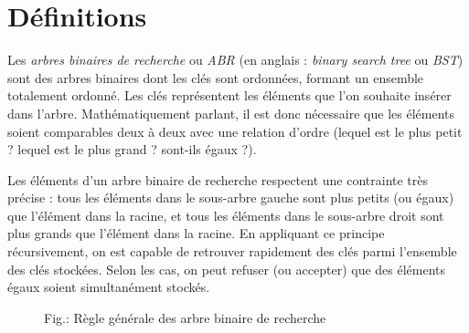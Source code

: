 \documentclass[11pt,a4paper]{article}
\begin{document}
\section{Définitions}

Les \textit{arbres binaires de recherche} ou \textit{ABR} (en anglais : \textit{binary search tree} ou \textit{BST}) sont des arbres binaires dont les clés sont ordonnées, formant un ensemble totalement ordonné.
Les clés représentent les éléments que l'on souhaite insérer dans l'arbre.
Mathématiquement parlant, il est donc nécessaire que les éléments soient comparables deux à deux avec une relation d'ordre (lequel est le plus petit ? lequel est le plus grand ? sont-ils égaux ?).

\medskip

Les éléments d'un arbre binaire de recherche respectent une contrainte très précise : tous les éléments dans le sous-arbre gauche sont plus petits (ou égaux) que l'élément dans la racine, et tous les éléments dans le sous-arbre droit sont plus grands que l'élément dans la racine.
En appliquant ce principe récursivement, on est capable de retrouver rapidement des clés parmi l'ensemble des clés stockées.
Selon les cas, on peut refuser (ou accepter) que des éléments égaux soient simultanément stockés.

\bigskip

\begin{figure}[ht!]
\caption{Fig.\thefigure : Règle générale des arbre binaire de recherche}
\label{fig:example1-BST-general-rule}
\end{figure}
\end{document}
